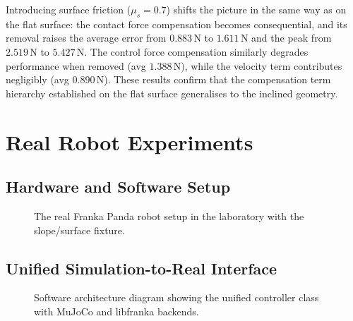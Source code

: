 \documentclass[
	german,%
	accentcolor=9c,%
	ruledheaders=section,%
	class=report,%
	thesis={type=bachelor},%
	fontsize=11pt,%
	parskip=half-,%
	custommargins=true,%
	marginpar=false,%
]{tudapub}
\begin{document}
Introducing surface friction ($\mu_s = 0.7$) shifts the picture in the same way as on the flat surface: the contact force compensation becomes consequential, and its removal raises the average error from $0.883\,\mathrm{N}$ to $1.611\,\mathrm{N}$ and the peak from $2.519\,\mathrm{N}$ to $5.427\,\mathrm{N}$. The control force compensation similarly degrades performance when removed (avg $1.388\,\mathrm{N}$), while the velocity term contributes negligibly (avg $0.890\,\mathrm{N}$). These results confirm that the compensation term hierarchy established on the flat surface generalises to the inclined geometry.


\chapter{Real Robot Experiments}

\section{Hardware and Software Setup}


\begin{figure}[htbp]
    \centering
    \caption{The real Franka Panda robot setup in the laboratory with the
             slope/surface fixture.}
    \label{fig:real_panda}
\end{figure}


\section{Unified Simulation-to-Real Interface}


\begin{figure}[htbp]
    \centering
    \caption{Software architecture diagram showing the unified controller
             class with MuJoCo and libfranka backends.}
    \label{fig:software_architecture}
\end{figure}
\end{document}
